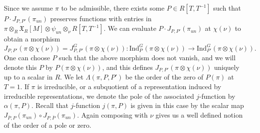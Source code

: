 \documentclass[10pt,a4paper]{article}
\theoremstyle{remark}
\theoremstyle{definition}
\newcommand{\ip}{\mathrm{Ind}_P^G}
\newcommand{\op}{\overline{P}}
\newcommand{\id}{\mathrm{Ind}}
\newcommand{\xc}{\mathfrak{X}}
\newcommand{\un}{_{un}}
\newcommand{\ra}{\rightarrow}
\begin{document}
Since we assume $\pi$ to be admissible, there exists some $P\in R[T,T^{-1}]$ such that $P\cdot J_{P,P'}(\pi\un)$ preserves functions with entries in $\pi\otimes_R\xc_R[M]\otimes\psi\un\otimes_\nu R[T,T^{-1}]$.
We can evaluate 
$P\cdot J_{P,P'}(\pi\un)$ at $\chi(\nu)$ to obtain a morphism \[J_{P,P'}(\pi\otimes\chi(\nu))=J_{P,P'}^G(\pi\otimes\chi(\nu))\colon \ip(\pi\otimes\chi(\nu))\ra\id_{P'}^G(\pi\otimes\chi(\nu)).\] One can choose $P$ such that the above morphism does not vanish, and we will denote this $P$ by $P(\pi\otimes\chi(\nu))$, and this defines $J_{P,P'}(\pi\otimes\chi(\nu))$ uniquely up to a scalar in $R$. 
We let $\Lambda(\pi,P,P')$ be the order of the zero of $P(\pi)$ at $T=1$.  
If $\pi$ is irreducible, or a subquotient of a representation induced by irreducible representations, we denote the pole of the associated $j$-function by $\alpha(\pi,P)$. Recall that $j$-function $j(\pi,P)$ is given in this case by the scalar map $J_{\op,P}(\pi\un)\circ J_{P,\op}(\pi\un)$. Again composing with $\nu$ gives us a well defined notion of the order of a pole or zero.
\end{document}
